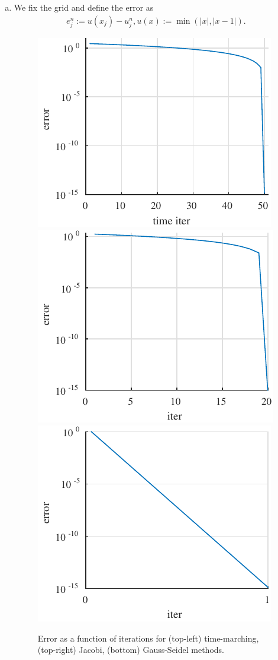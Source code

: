 \documentclass[10pt,a4paper,twoside, french]{article}
\numberwithin{equation}{section}
\numberwithin{figure}{section}
\numberwithin{table}{section}
\begin{document}
\begin{enumerate}
\begin{enumerate}[a.]
\item We fix the grid and define the error as 
\begin{align*}
e_j^ n:=u(x_j)-u_j^n, u(x):= \min(|x|,|x-1|). 
\end{align*}
\begin{figure}[h]
\centering
\includegraphics[scale=1]{fig/task1_error}
\includegraphics[scale=1]{fig/task2_error}
\includegraphics[scale=1]{fig/task3_error}
\caption{Error as a function of iterations for (top-left) time-marching, (top-right) Jacobi, (bottom) Gauss-Seidel methods.}
\label{fig:task1}
\end{figure}


\end{enumerate}
\end{enumerate}
\end{document}
